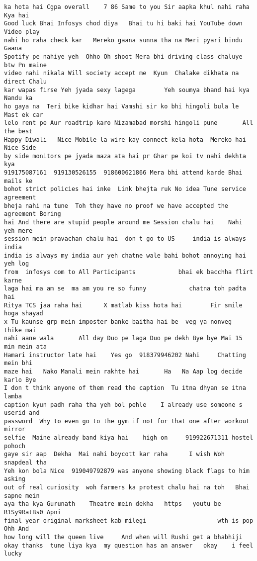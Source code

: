 \documentclass[11pt]{article}
\begin{document}
\begin{tcolorbox}[breakable, size=fbox, boxrule=.5pt, pad at break*=1mm, opacityfill=0]
\begin{Verbatim}[commandchars=\\\{\}]
ka hota hai Cgpa overall    7 86 Same to you Sir aapka khul nahi raha Kya hai
Good luck Bhai Infosys chod diya   Bhai tu hi baki hai YouTube down  Video play
nahi ho raha check kar   Mereko gaana sunna tha na Meri pyari bindu Gaana
Spotify pe nahiye yeh  Ohho Oh shoot Mera bhi driving class chaluye btw Pn maine
video nahi nikala Will society accept me  Kyun  Chalake dikhata na direct Chalu
kar wapas firse Yeh jyada sexy lagega        Yeh soumya bhand hai kya   Nandu ka
ho gaya na  Teri bike kidhar hai Vamshi sir ko bhi hingoli bula le Mast ek car
lelo rent pe Aur roadtrip karo Nizamabad morshi hingoli pune       All the best
Happy Diwali   Nice Mobile la wire kay connect kela hota  Mereko hai Nice Side
by side monitors pe jyada maza ata hai pr Ghar pe koi tv nahi dekhta kya
919175087161  919130526155  918600621866 Mera bhi attend karde Bhai mails ke
bohot strict policies hai inke  Link bhejta ruk No idea Tune service agreement
bheja nahi na tune  Toh they have no proof we have accepted the agreement Boring
hai And there are stupid people around me Session chalu hai    Nahi  yeh mere
session mein pravachan chalu hai  don t go to US     india is always india
india is always my india aur yeh chatne wale bahi bohot annoying hai yeh log
from  infosys com to All Participants            bhai ek bacchha flirt karne
laga hai ma am se  ma am you re so funny            chatna toh padta hai
Ritya TCS jaa raha hai      X matlab kiss hota hai        Fir smile hoga shayad
x Tu kaunse grp mein imposter banke baitha hai be  veg ya nonveg   thike mai
nahi aane wala       All day Duo pe laga Duo pe dekh Bye bye Mai 15 min mein ata
Hamari instructor late hai    Yes go  918379946202 Nahi     Chatting mein bhi
maze hai   Nako Manali mein rakhte hai       Ha   Na Aap log decide karlo Bye
I don t think anyone of them read the caption  Tu itna dhyan se itna lamba
caption kyun padh raha tha yeh bol pehle    I already use someone s userid and
password  Why to even go to the gym if not for that one after workout mirror
selfie  Maine already band kiya hai    high on     919922671311 hostel pohoch
gaye sir aap  Dekha  Mai nahi boycott kar raha      I wish Woh snapdeal tha
Yeh kon bola Nice  919049792879 was anyone showing black flags to him   asking
out of real curiosity  woh farmers ka protest chalu hai na toh   Bhai sapne mein
aya tha kya Gurunath    Theatre mein dekha   https   youtu be R1Sy9RatBs0 Apni
final year original marksheet kab milegi                    wth is pop  Ohh And
how long will the queen live     And when will Rushi get a bhabhiji
okay thanks  tune liya kya  my question has an answer   okay    i feel lucky

\end{Verbatim}
\end{tcolorbox}
\end{document}
